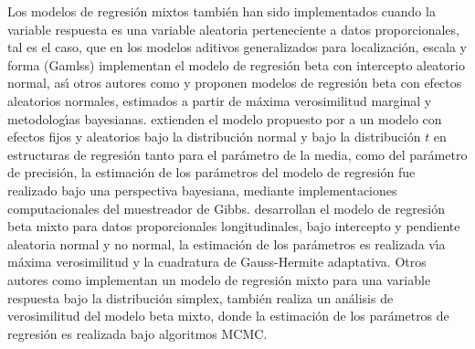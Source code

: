 Los modelos de regresi\'{o}n mixtos tambi\'{e}n han sido implementados cuando la variable respuesta es una variable aleatoria perteneciente a datos proporcionales, tal es el caso, que \cite{Stasinopoulos2} en los modelos aditivos generalizados para localizaci\'{o}n, escala y forma (Gamlss) implementan el modelo de regresi\'{o}n beta con intercepto aleatorio normal, as\'{\i} otros autores como \cite{Verkuilen1} y \cite{Bonat1} proponen modelos de regresi\'{o}n beta con efectos aleatorios normales, estimados a partir de m\'{a}xima verosimilitud marginal y metodolog\'{\i}as bayesianas. \cite{Figueroa1} extienden el modelo propuesto por \cite{Ferrari2} a un modelo con efectos fijos y aleatorios bajo la distribuci\'{o}n normal y bajo la distribuci\'{o}n $t$ en estructuras de regresi\'{o}n tanto para el par\'{a}metro de la media, como del par\'{a}metro de precisi\'{o}n, la estimaci\'{o}n de los par\'{a}metros del modelo de regresi\'{o}n fue realizado bajo una perspectiva bayesiana, mediante implementaciones computacionales del muestreador de Gibbs. \cite{Usuga1} desarrollan el modelo de regresi\'{o}n beta mixto para datos proporcionales longitudinales, bajo intercepto y pendiente aleatoria normal y no normal, la estimaci\'{o}n de los par\'{a}metros es realizada v\'{\i}a m\'{a}xima verosimilitud y la cuadratura de Gauss-Hermite adaptativa. Otros autores como \cite{Song1} implementan un modelo de regresi\'{o}n mixto para una variable respuesta bajo la distribuci\'{o}n simplex, \cite{Bonat2} tambi\'{e}n realiza un an\'{a}lisis de verosimilitud del modelo beta mixto, donde la estimaci\'{o}n de los par\'{a}metros de regresi\'{o}n es realizada bajo algoritmos MCMC.\\

